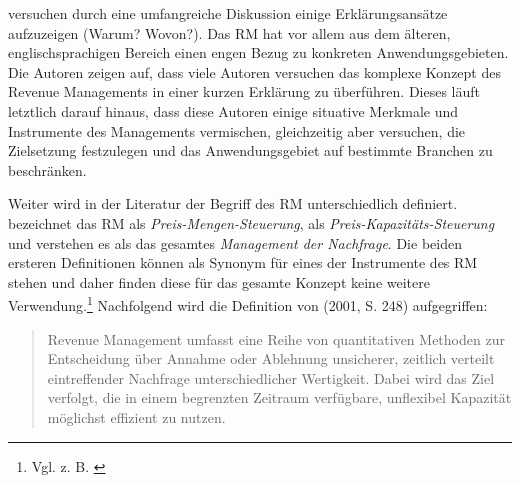 \cite{kimms2005revenue} versuchen durch eine umfangreiche Diskussion einige Erklärungsansätze aufzuzeigen (Warum? Wovon?). Das RM hat vor allem aus dem älteren, englischsprachigen Bereich einen engen Bezug zu konkreten Anwendungsgebieten. Die Autoren zeigen auf, dass viele Autoren versuchen das komplexe Konzept des Revenue Managements in einer kurzen Erklärung zu überführen. Dieses läuft letztlich darauf hinaus, dass diese Autoren einige situative Merkmale und Instrumente des Managements vermischen, gleichzeitig aber versuchen, die Zielsetzung festzulegen und das Anwendungsgebiet auf bestimmte Branchen zu beschränken. %

Weiter wird in der Literatur der Begriff des RM unterschiedlich definiert. \cite{friege1996yield} bezeichnet das RM als \textit{Preis-Mengen-Steuerung}, \cite{daudel1992yield} als \textit{Preis-Kapazitäts-Steuerung} und \cite{talluri2004theory} verstehen es als das gesamtes \textit{Management der Nachfrage}. Die beiden ersteren Definitionen können als Synonym für eines der Instrumente des RM stehen und daher finden diese für das gesamte Konzept keine weitere Verwendung.\footnote{Vgl. z. B. \cite{Petrick:2009aa}} Nachfolgend wird die Definition von \citeauthor{klein2001revenue} (2001, S. 248) aufgegriffen:

\begin{quote}
\glqq Revenue Management umfasst eine Reihe von quantitativen Methoden zur Entscheidung über Annahme oder Ablehnung unsicherer, zeitlich verteilt eintreffender Nachfrage unterschiedlicher Wertigkeit. Dabei wird das Ziel verfolgt, die in einem begrenzten Zeitraum verfügbare, unflexibel Kapazität möglichst effizient zu nutzen.\grqq
\end{quote}

